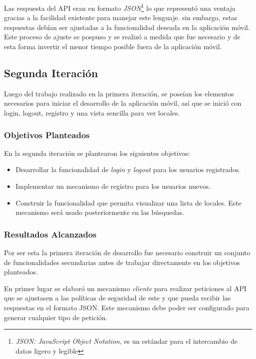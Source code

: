 Las respuesta del API eran en formato \textit{JSON}\footnote{\textit{JSON:} \textit{JavaScript Object Notation}, es un estándar para el intercambio de datos ligero y legible\cite{JSON}} lo que representó una ventaja gracias a la facilidad existente  para manejar este lenguaje. sin embargo, estas respuestas debían ser ajustadas a la funcionalidad deseada en la aplicación móvil. Este proceso de ajuste se pospuso y se realizó a medida que fue necesario y de esta forma invertir el menor tiempo posible fuera de la aplicación móvil.

\subsection{Segunda Iteración}

Luego del trabajo realizado en la primera iteración, se poseían los elementos necesarios para iniciar el desarrollo de la aplicación móvil, así que se inició con login, logout, registro    y una vista sencilla para ver locales.

\subsubsection{Objetivos Planteados}
En la segunda iteración se plantearon los siguientes objetivos:
\begin{itemize}
\item Desarrollar la funcionalidad de \textit{login} y \textit{logout} para los usuarios registrados.
\item Implementar un mecanismo de registro para los usuarios nuevos.
\item Construir la funcionalidad que permita visualizar una lista de locales. Este mecanismo será usado posteriormente en las búsquedas. 
\end{itemize}


\subsubsection{Resultados Alcanzados}

Por ser esta la primera iteración de desarrollo fue necesario construir un conjunto de funcionalidades secundarias antes de trabajar directamente en los objetivos planteados.

En primer lugar se elaboró un mecanismo \textit{cliente} para realizar peticiones al API que se ajustasen a las políticas de seguridad de este y que pueda recibir las respuestas en el formato JSON. Este mecanismo debe poder ser configurado para generar cualquier tipo de petición.

